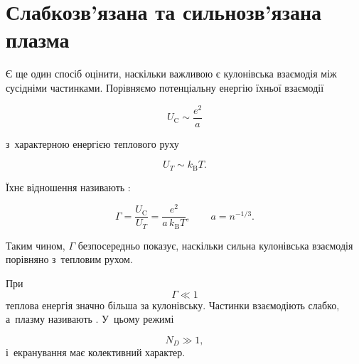 \section{Слабкозв'язана та сильнозв'язана плазма}



Є ще один спосіб оцінити, наскільки важливою є кулонівська взаємодія між сусідніми
частинками. Порівняємо потенціальну енергію їхньої взаємодії

\begin{equation*}
    U_{\mathrm C}\sim\frac{e^2}{a}
\end{equation*}

з~характерною енергією теплового руху

\begin{equation*}
    U_T\sim k_{\mathrm B}T.
\end{equation*}

Їхнє відношення називають :

\begin{equation}
    \Gamma=
    \frac{U_{\mathrm C}}{U_T}
    =
    \frac{e^2}{a\,k_{\mathrm B}T},
    \qquad
    a=n^{-1/3}.
\end{equation}

Таким чином, $\Gamma$ безпосередньо показує, наскільки сильна кулонівська взаємодія
порівняно з~тепловим рухом.

При
\begin{equation*}
    \Gamma\ll1
\end{equation*}
теплова енергія значно більша за кулонівську. Частинки взаємодіють слабко, а~плазму
називають . У~цьому режимі

\begin{equation*}
    N_D\gg1,
\end{equation*}
і~екранування має колективний характер.

